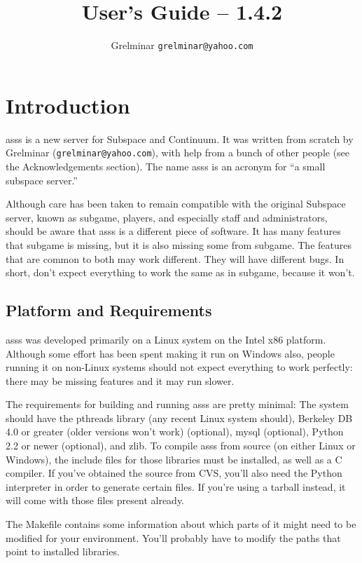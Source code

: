 \documentclass{article}
\title{\asss{} User's Guide -- 1.4.2}
\author{\small Grelminar \lt{}\texttt{grelminar@yahoo.com}\gt{}}
\newcommand{\asss}{asss}
\newcommand{\subgame}{subgame}
\begin{document}
\maketitle

\section{Introduction}

\asss{} is a new server for Subspace and Continuum. It was written from
scratch by Grelminar (\verb/grelminar@yahoo.com/), with help from a
bunch of other people (see the Acknowledgements section). The name
\asss{} is an acronym for ``a small subspace server.''

Although care has been taken to remain compatible with the original
Subspace server, known as \subgame{}, players, and especially staff and
administrators, should be aware that \asss{} is a different piece of
software. It has many features that \subgame{} is missing, but it is
also missing some from \subgame{}. The features that are common to both
may work different. They will have different bugs. In short, don't
expect everything to work the same as in \subgame{}, because it won't.

\subsection{Platform and Requirements}

\asss{} was developed primarily on a Linux system on the Intel x86
platform. Although some effort has been spent making it run on Windows
also, people running it on non-Linux systems should not expect
everything to work perfectly: there may be missing features and it may
run slower.

The requirements for building and running \asss{} are pretty minimal:
The system should have the pthreads library (any recent Linux system
should), Berkeley DB 4.0 or greater (older versions won't work)
(optional), mysql (optional), Python 2.2 or newer (optional), and zlib.
To compile \asss{} from source (on either Linux or Windows), the include
files for those libraries must be installed, as well as a C compiler. If
you've obtained the source from CVS, you'll also need the Python
interpreter in order to generate certain files. If you're using a
tarball instead, it will come with those files present already.

The Makefile contains some information about which parts of it might
need to be modified for your environment. You'll probably have to modify
the paths that point to installed libraries.
\end{document}
